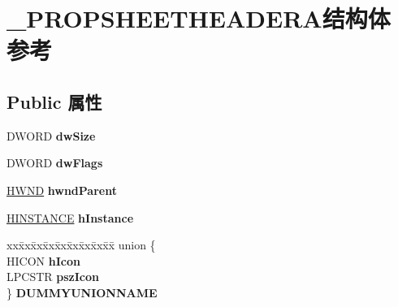 \hypertarget{struct___p_r_o_p_s_h_e_e_t_h_e_a_d_e_r_a}{}\section{\+\_\+\+P\+R\+O\+P\+S\+H\+E\+E\+T\+H\+E\+A\+D\+E\+R\+A结构体 参考}
\label{struct___p_r_o_p_s_h_e_e_t_h_e_a_d_e_r_a}
\subsection*{Public 属性}
\begin{DoxyCompactItemize}
\item 
\mbox{\label{struct___p_r_o_p_s_h_e_e_t_h_e_a_d_e_r_a_a3c3423526e55cf78c3dfeea6260d8649}} 
D\+W\+O\+RD {\bfseries dw\+Size}
\item 
\mbox{\label{struct___p_r_o_p_s_h_e_e_t_h_e_a_d_e_r_a_a2652d2a9f26b77cceb91a7e71fa16ccb}} 
D\+W\+O\+RD {\bfseries dw\+Flags}
\item 
\mbox{\label{struct___p_r_o_p_s_h_e_e_t_h_e_a_d_e_r_a_aa432d1ed3c2b36705b3d0c901ff79146}} 
\hyperlink{interfacevoid}{H\+W\+ND} {\bfseries hwnd\+Parent}
\item 
\mbox{\label{struct___p_r_o_p_s_h_e_e_t_h_e_a_d_e_r_a_a79bf7e958955e296ee069739e8f66097}} 
\hyperlink{interfacevoid}{H\+I\+N\+S\+T\+A\+N\+CE} {\bfseries h\+Instance}
\item 
\mbox{\label{struct___p_r_o_p_s_h_e_e_t_h_e_a_d_e_r_a_a24167fc1ebf5328f96359fb831b6bd45}} 
\begin{tabbing}
xx\=xx\=xx\=xx\=xx\=xx\=xx\=xx\=xx\=\kill
union \{\\
\>HICON {\bfseries hIcon}\\
\>LPCSTR {\bfseries pszIcon}\\
\} {\bfseries DUMMYUNIONNAME}\\


\end{tabbing}
\end{DoxyCompactItemize}
